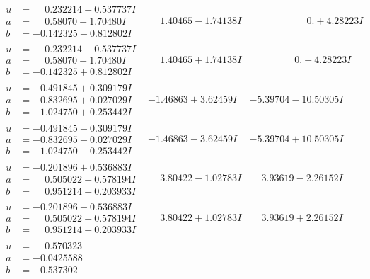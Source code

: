 \documentclass[1p]{elsarticle_modified}
\theoremstyle{definition}
\begin{document}
$$\begin{array}{c|c|c}
\begin{aligned}
u &= \phantom{-}0.232214 + 0.537737 I \\
a &= \phantom{-}0.58070 + 1.70480 I \\
b &= -0.142325 - 0.812802 I\end{aligned}
 & \phantom{-}1.40465 - 1.74138 I & \phantom{-0.000000 -}0. + 4.28223 I \\ \hline\begin{aligned}
u &= \phantom{-}0.232214 - 0.537737 I \\
a &= \phantom{-}0.58070 - 1.70480 I \\
b &= -0.142325 + 0.812802 I\end{aligned}
 & \phantom{-}1.40465 + 1.74138 I & \phantom{-0.000000 } 0. - 4.28223 I \\ \hline\begin{aligned}
u &= -0.491845 + 0.309179 I \\
a &= -0.832695 + 0.027029 I \\
b &= -1.024750 + 0.253442 I\end{aligned}
 & -1.46863 + 3.62459 I & -5.39704 - 10.50305 I \\ \hline\begin{aligned}
u &= -0.491845 - 0.309179 I \\
a &= -0.832695 - 0.027029 I \\
b &= -1.024750 - 0.253442 I\end{aligned}
 & -1.46863 - 3.62459 I & -5.39704 + 10.50305 I \\ \hline\begin{aligned}
u &= -0.201896 + 0.536883 I \\
a &= \phantom{-}0.505022 + 0.578194 I \\
b &= \phantom{-}0.951214 - 0.203933 I\end{aligned}
 & \phantom{-}3.80422 - 1.02783 I & \phantom{-}3.93619 - 2.26152 I \\ \hline\begin{aligned}
u &= -0.201896 - 0.536883 I \\
a &= \phantom{-}0.505022 - 0.578194 I \\
b &= \phantom{-}0.951214 + 0.203933 I\end{aligned}
 & \phantom{-}3.80422 + 1.02783 I & \phantom{-}3.93619 + 2.26152 I \\ \hline\begin{aligned}
u &= \phantom{-}0.570323\phantom{ +0.000000I} \\
a &= -0.0425588\phantom{ +0.000000I} \\
b &= -0.537302\phantom{ +0.000000I}\end{aligned}

\end{array}$$
\end{document}
